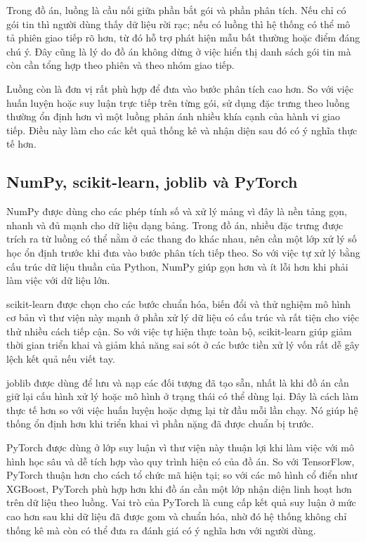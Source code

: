 \documentclass[../DoAn.tex]{subfiles}
\begin{document}
Trong đồ án, luồng là cầu nối giữa phần bắt gói và phần phân tích. Nếu chỉ có gói tin thì người dùng thấy dữ liệu rời rạc; nếu có luồng thì hệ thống có thể mô tả phiên giao tiếp rõ hơn, từ đó hỗ trợ phát hiện mẫu bất thường hoặc điểm đáng chú ý. Đây cũng là lý do đồ án không dừng ở việc hiển thị danh sách gói tin mà còn cần tổng hợp theo phiên và theo nhóm giao tiếp.

Luồng còn là đơn vị rất phù hợp để đưa vào bước phân tích cao hơn. So với việc huấn luyện hoặc suy luận trực tiếp trên từng gói, sử dụng đặc trưng theo luồng thường ổn định hơn vì một luồng phản ánh nhiều khía cạnh của hành vi giao tiếp. Điều này làm cho các kết quả thống kê và nhận diện sau đó có ý nghĩa thực tế hơn.

\subsection{NumPy, scikit-learn, joblib và PyTorch}
NumPy được dùng cho các phép tính số và xử lý mảng vì đây là nền tảng gọn, nhanh và đủ mạnh cho dữ liệu dạng bảng. Trong đồ án, nhiều đặc trưng được trích ra từ luồng có thể nằm ở các thang đo khác nhau, nên cần một lớp xử lý số học ổn định trước khi đưa vào bước phân tích tiếp theo. So với việc tự xử lý bằng cấu trúc dữ liệu thuần của Python, NumPy giúp gọn hơn và ít lỗi hơn khi phải làm việc với dữ liệu lớn.

scikit-learn được chọn cho các bước chuẩn hóa, biến đổi và thử nghiệm mô hình cơ bản vì thư viện này mạnh ở phần xử lý dữ liệu có cấu trúc và rất tiện cho việc thử nhiều cách tiếp cận. So với việc tự hiện thực toàn bộ, scikit-learn giúp giảm thời gian triển khai và giảm khả năng sai sót ở các bước tiền xử lý vốn rất dễ gây lệch kết quả nếu viết tay.

joblib được dùng để lưu và nạp các đối tượng đã tạo sẵn, nhất là khi đồ án cần giữ lại cấu hình xử lý hoặc mô hình ở trạng thái có thể dùng lại. Đây là cách làm thực tế hơn so với việc huấn luyện hoặc dựng lại từ đầu mỗi lần chạy. Nó giúp hệ thống ổn định hơn khi triển khai vì phần nặng đã được chuẩn bị trước.

PyTorch được dùng ở lớp suy luận vì thư viện này thuận lợi khi làm việc với mô hình học sâu và dễ tích hợp vào quy trình hiện có của đồ án. So với TensorFlow, PyTorch thuận hơn cho cách tổ chức mã hiện tại; so với các mô hình cổ điển như XGBoost, PyTorch phù hợp hơn khi đồ án cần một lớp nhận diện linh hoạt hơn trên dữ liệu theo luồng. Vai trò của PyTorch là cung cấp kết quả suy luận ở mức cao hơn sau khi dữ liệu đã được gom và chuẩn hóa, nhờ đó hệ thống không chỉ thống kê mà còn có thể đưa ra đánh giá có ý nghĩa hơn với người dùng.
\end{document}
